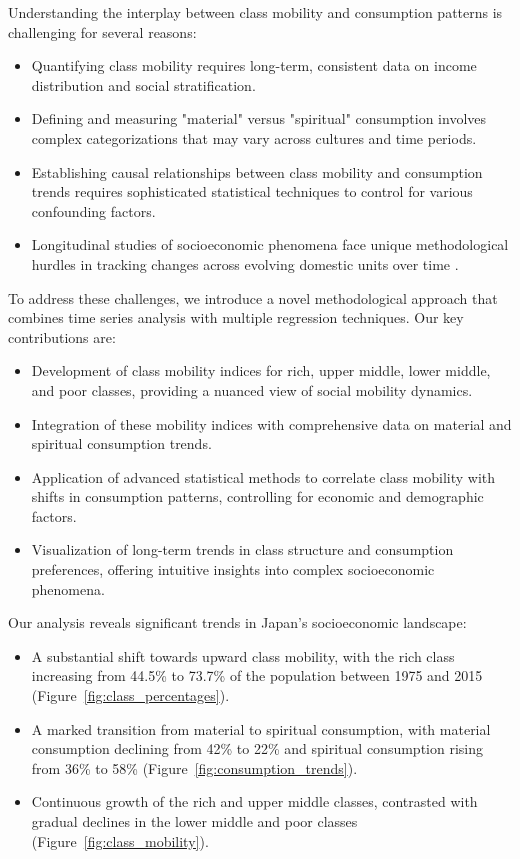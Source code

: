 \documentclass{article} %
\begin{document}
Understanding the interplay between class mobility and consumption patterns is challenging for several reasons:

\begin{itemize}
    \item Quantifying class mobility requires long-term, consistent data on income distribution and social stratification.
    \item Defining and measuring "material" versus "spiritual" consumption involves complex categorizations that may vary across cultures and time periods.
    \item Establishing causal relationships between class mobility and consumption trends requires sophisticated statistical techniques to control for various confounding factors.
    \item Longitudinal studies of socioeconomic phenomena face unique methodological hurdles in tracking changes across evolving domestic units over time \citep{Brockington2019AssetsAD}.
\end{itemize}

To address these challenges, we introduce a novel methodological approach that combines time series analysis with multiple regression techniques. Our key contributions are:

\begin{itemize}
    \item Development of class mobility indices for rich, upper middle, lower middle, and poor classes, providing a nuanced view of social mobility dynamics.
    \item Integration of these mobility indices with comprehensive data on material and spiritual consumption trends.
    \item Application of advanced statistical methods to correlate class mobility with shifts in consumption patterns, controlling for economic and demographic factors.
    \item Visualization of long-term trends in class structure and consumption preferences, offering intuitive insights into complex socioeconomic phenomena.
\end{itemize}

Our analysis reveals significant trends in Japan's socioeconomic landscape:

\begin{itemize}
    \item A substantial shift towards upward class mobility, with the rich class increasing from 44.5\% to 73.7\% of the population between 1975 and 2015 (Figure~\ref{fig:class_percentages}).
    \item A marked transition from material to spiritual consumption, with material consumption declining from 42\% to 22\% and spiritual consumption rising from 36\% to 58\% (Figure~\ref{fig:consumption_trends}).
    \item Continuous growth of the rich and upper middle classes, contrasted with gradual declines in the lower middle and poor classes (Figure~\ref{fig:class_mobility}).
\end{itemize}
\end{document}
